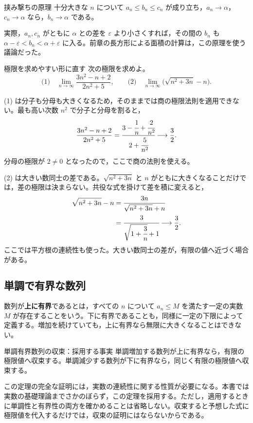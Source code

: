 \begin{theorem}{挟み撃ちの原理}
十分大きな $n$ について $a_n\le b_n\le c_n$ が成り立ち，$a_n\to\alpha$，$c_n\to\alpha$ なら，$b_n\to\alpha$ である。
\end{theorem}

実際，$a_n,c_n$ がともに $\alpha$ との差を $\varepsilon$ より小さくすれば，その間の $b_n$ も $\alpha-\varepsilon<b_n<\alpha+\varepsilon$ に入る。前章の長方形による面積の計算は，この原理を使う議論だった。

\begin{example}{極限を求めやすい形に直す}
次の極限を求めよ。
\[
 \text{(1)}\quad\lim_{n\to\infty}\frac{3n^2-n+2}{2n^2+5},
 \qquad
 \text{(2)}\quad\lim_{n\to\infty}\bigl(\sqrt{n^2+3n}-n\bigr).
\]
\end{example}
(1) は分子も分母も大きくなるため，そのままでは商の極限法則を適用できない。最も高い次数 $n^2$ で分子と分母を割ると，
\[
 \frac{3n^2-n+2}{2n^2+5}
 =\cfrac{3-\cfrac1n+\cfrac2{n^2}}{2+\cfrac5{n^2}}
 \longrightarrow\frac32.
\]
分母の極限が $2\ne0$ となったので，ここで商の法則を使える。

(2) は大きい数同士の差である。$\sqrt{n^2+3n}$ と $n$ がともに大きくなることだけでは，差の極限は決まらない。共役な式を掛けて差を積に変えると，
\begin{align*}
 \sqrt{n^2+3n}-n
 &=\frac{3n}{\sqrt{n^2+3n}+n}\\
 &=\cfrac3{\sqrt{1+\cfrac3n}+1}\longrightarrow\frac32.
\end{align*}
ここでは平方根の連続性も使った。大きい数同士の差が，有限の値へ近づく場合がある。

\subsection{単調で有界な数列}
数列が\textbf{上に有界}であるとは，すべての $n$ について $a_n\le M$ を満たす一定の実数 $M$ が存在することをいう。下に有界であることも，同様に一定の下限によって定義する。増加を続けていても，上に有界なら無限に大きくなることはできない。

\begin{theorem}{単調有界数列の収束：採用する事実}
単調増加する数列が上に有界なら，有限の極限値へ収束する。単調減少する数列が下に有界なら，同じく有限の極限値へ収束する。
\end{theorem}

この定理の完全な証明には，実数の連続性に関する性質が必要になる。本書では実数の基礎理論までさかのぼらず，この定理を採用する。ただし，適用するときに単調性と有界性の両方を確かめることは省略しない。収束すると予想した式に極限値を代入するだけでは，収束の証明にはならないからである。

